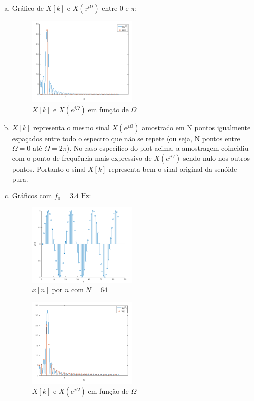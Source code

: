 \documentclass{article}
\begin{document}
\begin{enumerate}[(a)]
\item

    Gráfico de $X[k]$ e $X(e^{j\Omega})$ entre $0$ e $\pi$:

\begin{figure}[H]
\centering
\includegraphics[width=0.5\textwidth]{images/xk_xejomega.png}
    \caption{$X[k]$ e $X(e^{j\Omega})$ em função de $\Omega$}
\end{figure}

\item

    $X[k]$ representa o mesmo sinal $X(e^{j\Omega})$ amostrado em N pontos igualmente espaçados entre todo o espectro que não se repete (ou seja, N pontos entre $\Omega = 0$ até $\Omega = 2\pi$). No caso específico do plot acima, a amostragem coincidiu com o ponto de frequência mais expressivo de $X(e^{j\Omega})$ sendo nulo nos outros pontos. Portanto o sinal $X[k]$ representa bem o sinal original da senóide pura.

\item

Gráficos com $f_0 = 3.4$ Hz:

\begin{figure}[H]
\centering
\includegraphics[width=0.5\textwidth]{images/xn_3-4.png}
    \caption{$x[n]$ por $n$ com $N = 64$}
\end{figure}

\begin{figure}[H]
\centering
\includegraphics[width=0.5\textwidth]{images/xk_xejomega_3-4.png}
    \caption{$X[k]$ e $X(e^{j\Omega})$ em função de $\Omega$}
\end{figure}


\end{enumerate}
\end{document}
